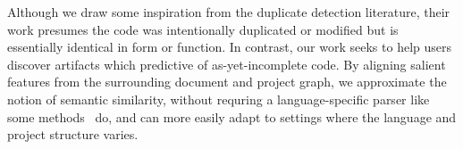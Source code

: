 \documentclass[sigconf]{acmart}
\begin{document}


  Although we draw some inspiration from the duplicate detection literature, their work presumes the code was intentionally duplicated or modified but is essentially identical in form or function. In contrast, our work seeks to help users discover artifacts which predictive of as-yet-incomplete code. By aligning salient features from the surrounding document and project graph, we approximate the notion of semantic similarity, without requring a language-specific parser like some methods~\citep{cambronero2019deep} do, and can more easily adapt to settings where the language and project structure varies.
\end{document}

